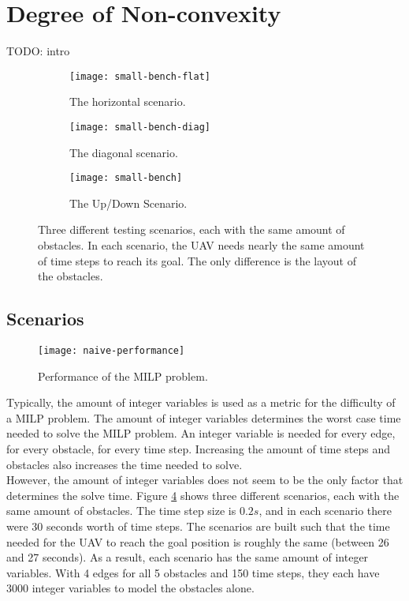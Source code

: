 \section{Degree of Non-convexity}
TODO: intro
\begin{figure}
	\centering
	\begin{subfigure}[t]{1\columnwidth}
        		\texttt{[image: small-bench-flat]}
        		\caption{The horizontal scenario.}
        		\label{fig:convex-straight}
	\end{subfigure}
	\par\bigskip
	\begin{subfigure}[t]{1\columnwidth}
        		\texttt{[image: small-bench-diag]}
        		\caption{The diagonal scenario.}
        		 \label{fig:convex-diag}
	\end{subfigure}	
	\par\bigskip
	\begin{subfigure}[t]{0.8\columnwidth}
        		\texttt{[image: small-bench]}
        		\caption{The Up/Down Scenario.}
        		 \label{fig:convex-full}
	\end{subfigure}	
    \caption{Three different testing scenarios, each with the same amount of obstacles. In each scenario, the UAV needs nearly the same amount of time steps to reach its goal. The only difference is the layout of the obstacles.}
    \label{fig:benchmarks}     
\end{figure}

\subsection{Scenarios}
\label{subsec:naive-scenarios}
\begin{figure}[]
	\centering
	\texttt{[image: naive-performance]}
	\caption{Performance of the MILP problem.}
	\label{fig:naive-performance}
\end{figure}
Typically, the amount of integer variables is used as a metric for the difficulty of a MILP problem. The amount of integer variables determines the worst case time needed to solve the MILP problem. An integer variable is needed for every edge, for every obstacle, for every time step. Increasing the amount of time steps and obstacles also increases the time needed to solve.\\
However, the amount of integer variables does not seem to be the only factor that determines the solve time. Figure \ref{fig:benchmarks} shows three different scenarios, each with the same amount of obstacles. The time step size is $0.2s$, and in each scenario there were 30 seconds worth of time steps. The scenarios are built such that the time needed for the UAV to reach the goal position is roughly the same (between 26 and 27 seconds). As a result, each scenario has the same amount of integer variables. With 4 edges for all 5 obstacles and 150 time steps, they each have 3000 integer variables to model the obstacles alone.\\

